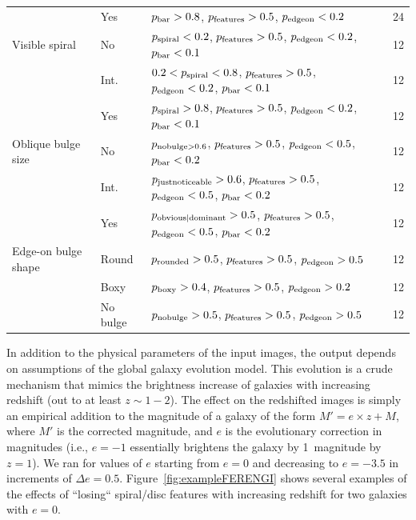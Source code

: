 \documentclass[usenatbib]{mn2e}
\begin{document}
\begin{table}
\begin{tabular}{lllc}
                    & Yes       & $p_{\rm bar} > 0.8$, $p_{\rm features} > 0.5$, $p_{\rm edgeon} < 0.2$                                 & 24 \\
Visible spiral      & No        & $p_{\rm spiral} < 0.2$, $p_{\rm features} > 0.5$, $p_{\rm edgeon} < 0.2$, $p_{\rm bar} < 0.1$         & 12 \\
                    & Int.      & $0.2 < p_{\rm spiral} < 0.8$, $p_{\rm features} > 0.5$, $p_{\rm edgeon} < 0.2$, $p_{\rm bar} < 0.1$   & 12 \\
                    & Yes       & $p_{\rm spiral} > 0.8$, $p_{\rm features} > 0.5$, $p_{\rm edgeon} < 0.2$, $p_{\rm bar} < 0.1$         & 12 \\
Oblique bulge size  & No        & $p_{\rm nobulge>0.6}$, $p_{\rm features} > 0.5$, $p_{\rm edgeon} < 0.5$, $p_{\rm bar} < 0.2$          & 12 \\
                    & Int.      & $p_{\rm justnoticeable}>0.6$, $p_{\rm features} > 0.5$, $p_{\rm edgeon} < 0.5$, $p_{\rm bar} < 0.2$   & 12 \\
                    & Yes       & $p_{\rm obvious|dominant}>0.5$, $p_{\rm features} > 0.5$, $p_{\rm edgeon} < 0.5$, $p_{\rm bar} < 0.2$ & 12 \\
Edge-on bulge shape & Round     & $p_{\rm rounded}>0.5$, $p_{\rm features} > 0.5$, $p_{\rm edgeon} > 0.5$                               & 12 \\
                    & Boxy      & $p_{\rm boxy}>0.4$, $p_{\rm features} > 0.5$, $p_{\rm edgeon} > 0.2$                                  & 12 \\
                    & No bulge  & $p_{\rm nobulge}>0.5$, $p_{\rm features} > 0.5$, $p_{\rm edgeon} > 0.5$                               & 12 \\
\hline\hline
\end{tabular}
\end{table}

In addition to the physical parameters of the input images, the \ferengi{} output depends on assumptions of the global galaxy evolution model. This evolution is a crude mechanism that mimics the brightness increase of galaxies with increasing redshift (out to at least $z\sim1-2$). The effect on the redshifted images is simply an empirical addition to the magnitude of a galaxy of the form $M' = e\times z + M$, where $M'$ is the corrected magnitude, and $e$ is the evolutionary correction in magnitudes (i.e., $e=-1$ essentially brightens the galaxy by 1~magnitude by $z=1$). We ran \ferengi{} for values of $e$ starting from $e=0$ and decreasing to $e=-3.5$ in increments of $\Delta e = 0.5$. Figure~\ref{fig:exampleFERENGI} shows several examples of the effects of ``losing`` spiral/disc features with increasing redshift for two galaxies with $e=0$. 
\end{document}
